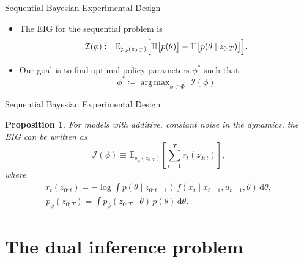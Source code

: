 \documentclass[10pt, aspectratio=1610]{beamer}
\DeclareMathOperator*{\argmax}{arg\,max}
\newcommand{\dd}{\mathrm{d}}
\newtheorem{proposition}[theorem]{Proposition}
\begin{document}
    \begin{frame}{Sequential Bayesian Experimental Design}
      \begin{itemize}
        \item The EIG for the sequential problem is
          \begin{equation}
            \mathcal{I}(\phi) \coloneq \mathbb{E}_{p_{\phi}(z_{0:T})} \Bigl[ \mathbb{H}\bigl[p(\theta)\bigr] - \mathbb{H}\bigl[p(\theta \mid z_{0:T})\bigr] \Bigr].
          \end{equation}
        \item Our goal is to find optimal policy parameters $\phi^*$ such that
          \begin{equation}
            \phi^* \coloneq \argmax_{\phi \in \Phi} \,\, \mathcal{I}(\phi)
          \end{equation}
      \end{itemize}
    \end{frame}

    \begin{frame}{Sequential Bayesian Experimental Design}
      \begin{proposition}
        For models with additive, constant noise in the dynamics, the EIG can be written as
        \begin{equation}\label{eq:eig_constant_noise}
            \mathcal{I}(\phi) \equiv \mathbb{E}_{p_{\phi}(z_{0:T})} \left[ \sum_{t=1}^T r_{t}(z_{0:t}) \right],
        \end{equation}
        where
        \begin{gather}
          r_{t}(z_{0:t}) = - \log \int p(\theta \mid z_{0:t-1}) \, f(x_t \mid x_{t-1}, u_{t-1}, \theta) \, \dd \theta, \\
          p_\phi(z_{0:T}) = \int p_\phi(z_{0:T} \mid \theta) \, p(\theta) \, \dd \theta.
        \end{gather}
      \end{proposition}
    \end{frame}

  \section{The dual inference problem}
\end{document}
